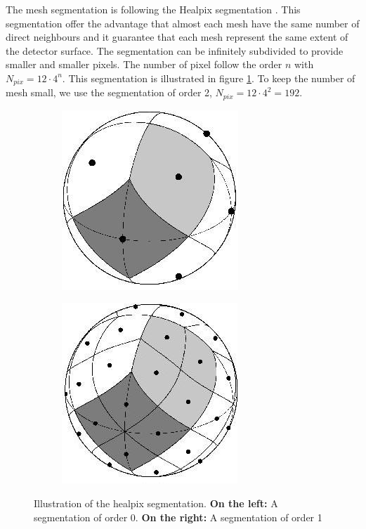 \documentclass[../main.tex]{subfiles}
\begin{document}
The mesh segmentation is following the Healpix segmentation \cite{gorski_healpix_2005}. This segmentation offer the advantage that almost each mesh have the same number of direct neighbours and it guarantee that each mesh represent the same extent of the detector surface. The segmentation can be infinitely subdivided to provide smaller and smaller pixels. The number of pixel follow the order $n$ with $N_{pix} = 12 \cdot 4^n$. This segmentation is illustrated in figure \ref{fig:jgnn:healpix}. To keep the number of mesh small, we use the segmentation of order 2, $N_{pix} = 12 \cdot 4^2 = 192$.

\begin{figure}
  \centering
  \begin{subfigure}[t]{0.48\linewidth}
    \centering
    \includegraphics[width=0.5\linewidth]{images/jgnn/healpix_0.jpg}
  \end{subfigure}
  \hfill
  \begin{subfigure}[t]{0.48\linewidth}
    \centering
    \includegraphics[width=0.5\linewidth]{images/jgnn/healpix_1.jpg}
  \end{subfigure}
  \caption{Illustration of the healpix segmentation. \textbf{On the left:} A segmentation of order 0. \textbf{On the right:} A segmentation of order 1}
  \label{fig:jgnn:healpix}
\end{figure}
\end{document}
